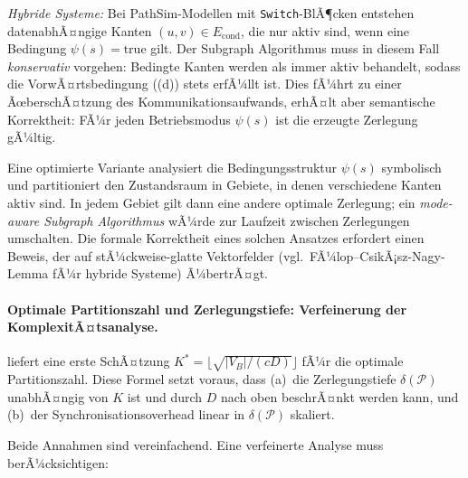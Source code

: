 ﻿\documentclass[12pt,a4paper]{article}
\theoremstyle{definition}
\begin{document}
\emph{Hybride Systeme:} Bei PathSim-Modellen mit
\texttt{Switch}-BlÃ¶cken entstehen datenabhÃ¤ngige Kanten
$(u,v) \in E_{\mathrm{cond}}$, die nur aktiv sind, wenn eine Bedingung
$\psi(s) = \mathrm{true}$ gilt. Der Subgraph Algorithmus muss in
diesem Fall \emph{konservativ} vorgehen: Bedingte Kanten werden als
immer aktiv behandelt, sodass die VorwÃ¤rtsbedingung ((d))
stets erfÃ¼llt ist. Dies fÃ¼hrt zu einer ÃœberschÃ¤tzung des
Kommunikationsaufwands, erhÃ¤lt aber semantische Korrektheit:
FÃ¼r jeden Betriebsmodus $\psi(s)$ ist die erzeugte Zerlegung gÃ¼ltig.

Eine optimierte Variante analysiert die Bedingungsstruktur
$\psi(s)$ symbolisch und partitioniert den Zustandsraum in
Gebiete, in denen verschiedene Kanten aktiv sind. In jedem
Gebiet gilt dann eine andere optimale Zerlegung; ein
\emph{mode-aware Subgraph Algorithmus} wÃ¼rde zur Laufzeit zwischen
Zerlegungen umschalten. Die formale Korrektheit eines solchen
Ansatzes erfordert einen Beweis, der  auf
stÃ¼ckweise-glatte Vektorfelder (vgl.\ FÃ¼lop--CsikÃ¡sz-Nagy-Lemma
fÃ¼r hybride Systeme) Ã¼bertrÃ¤gt.

\paragraph{Optimale Partitionszahl und Zerlegungstiefe: Verfeinerung der KomplexitÃ¤tsanalyse.}
 liefert eine erste SchÃ¤tzung $K^* =
\lfloor\sqrt{|V_B|/(cD)}\rfloor$ fÃ¼r die optimale Partitionszahl.
Diese Formel setzt voraus, dass
(a)~die Zerlegungstiefe $\delta(\mathcal{P})$ unabhÃ¤ngig von $K$ ist und
durch $D$ nach oben beschrÃ¤nkt werden kann, und
(b)~der Synchronisationsoverhead linear in $\delta(\mathcal{P})$ skaliert.

Beide Annahmen sind vereinfachend. Eine verfeinerte Analyse muss berÃ¼cksichtigen:
\end{document}
